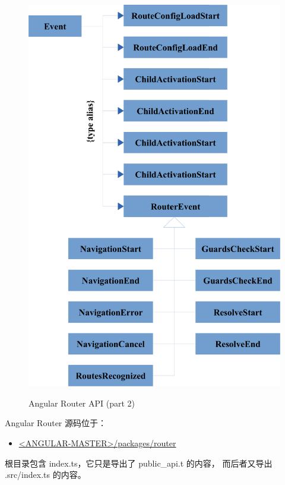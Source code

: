\clearpage

\begin{figure}[!hbt]
  \centering
  \caption{Angular Router API (part 2)}
  \includegraphics[width=0.75\linewidth]{13_the_router_package/router_api_3}
  \label{fig:router_api_3}
\end{figure}

\clearpage


Angular Router 源码位于：

\begin{itemize}
  \item \href{https://github.com/angular/angular/tree/master/packages/router}
        {<ANGULAR-MASTER>/packages/router}
\end{itemize}


根目录包含 index.ts，它只是导出了 public\_api.t 的内容，
而后者又导出\, .src/index.ts 的内容。


